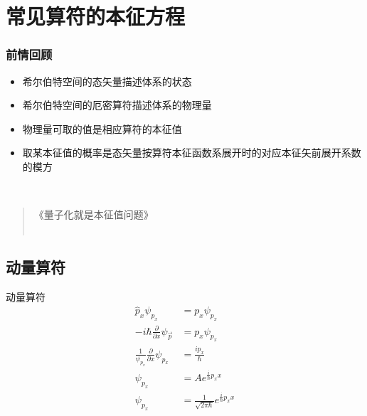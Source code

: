 \section{常见算符的本征方程}

\begin{frame}
    \frametitle{前情回顾}
    \begin{itemize}
        \item 希尔伯特空间的态矢量描述体系的状态
        \item 希尔伯特空间的厄密算符描述体系的物理量
        \item 物理量可取的值是相应算符的本征值
        \item 取某本征值的概率是态矢量按算符本征函数系展开时的对应本征矢前展开系数的模方
    \end{itemize} 
    ~~ \\ \vspace{0.8em}
    \begin{quote}
     《量子化就是本征值问题》\\
     ~~\\
    \end{quote}
\end{frame} 


\subsection{动量算符}

\begin{frame} {动量算符}
    \解~  
    \begin{equation*}
        \begin{split}
            \hat{p}_x\psi_{p_x}&=p_x \psi_{p_x} \\
            -i\hbar\frac{\partial}{\partial x} \psi_{\vec p} &= p_x \psi_{p_x}\\
            \frac{1}{\psi_{p_{x}}} \frac{\partial}{\partial x} \psi_{p_{x}}&=\frac{i p_{x}}{\hbar}\\
            \psi_{p_{x}}&=Ae^{\frac{i}{\hbar}p_x x} \\
            \psi_{p_{x}}&=\frac{1}{\sqrt{2\pi\hbar}}e^{\frac{i}{\hbar}p_x x}
        \end{split} 
    \end{equation*}
\end{frame} 

